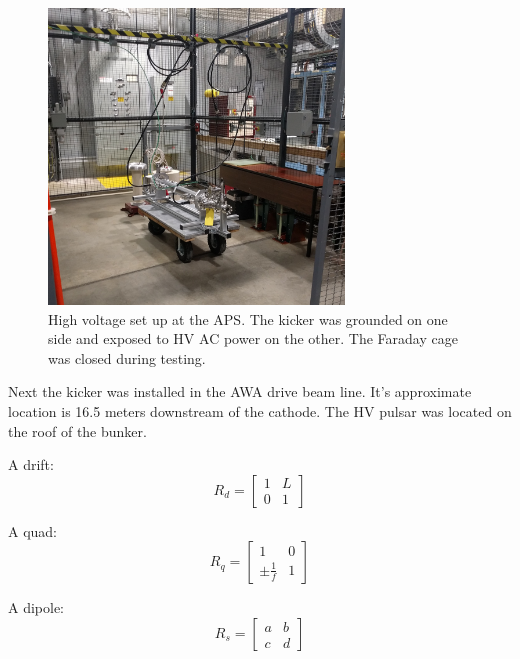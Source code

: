 \begin{figure}[h]
	\begin{center}
		\includegraphics[width=0.7\textwidth]{./images/kicker1}\caption{High voltage set up at the APS. The kicker was grounded on one side and exposed to HV AC power on the other. The Faraday cage was closed during testing. }
		\label{fig:AWAHVkicker}
	\end{center}
\end{figure}





Next the kicker was installed in the AWA drive beam line.
It's approximate location is 16.5 meters downstream of the cathode.
The HV pulsar was located on the roof of the bunker.




A drift: 
\begin{equation}
R_d = 
\begin{bmatrix}
1 & L \\
0 & 1
\end{bmatrix}
\end{equation}

A quad: 
\begin{equation}
R_q = 
\begin{bmatrix}
1 & 0 \\
\pm \frac{1}{f} & 1
\end{bmatrix}
\end{equation}

A dipole:
\begin{equation}
R_s = 
\begin{bmatrix}
a & b \\
c & d
\end{bmatrix}
\end{equation}


